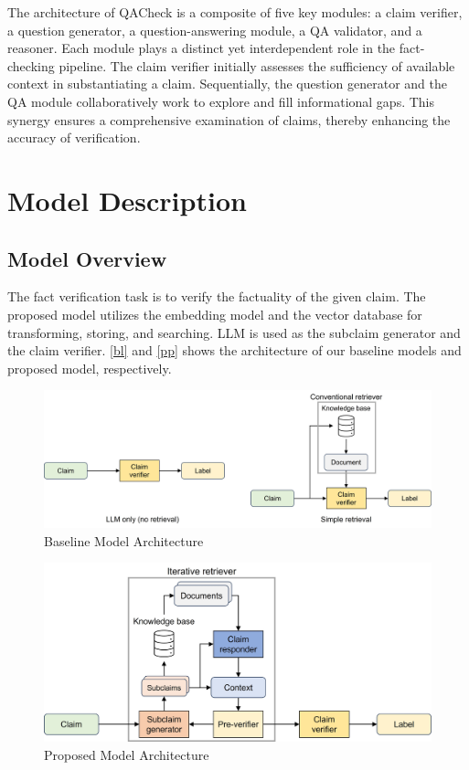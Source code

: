 \documentclass{article}
\begin{document}
The architecture of QACheck is a composite of five key modules: a claim verifier, a question generator, a question-answering module, a QA validator, and a reasoner. Each module plays a distinct yet interdependent role in the fact-checking pipeline. The claim verifier initially assesses the sufficiency of available context in substantiating a claim. Sequentially, the question generator and the QA module collaboratively work to explore and fill informational gaps. This synergy ensures a comprehensive examination of claims, thereby enhancing the accuracy of verification. 

\section{Model Description}

\subsection{Model Overview}
The fact verification task is to verify the factuality of the given claim. The proposed model utilizes the embedding model and the vector database for transforming, storing, and searching. LLM is used as the subclaim generator and the claim verifier. \autoref{bl} and \autoref{pp} shows the architecture of our baseline models and proposed model, respectively. \par

\begin{figure}[h]
  \centering
  \includegraphics[width=0.95\linewidth]{Figure/fig1.jpg}
  \caption{\label{bl}Baseline Model Architecture}
\end{figure}
\begin{figure}[h]
  \centering
  \includegraphics[width=0.75\linewidth]{Figure/fig2.jpg}
  \caption{\label{pp}Proposed Model Architecture}
\end{figure}
\end{document}
